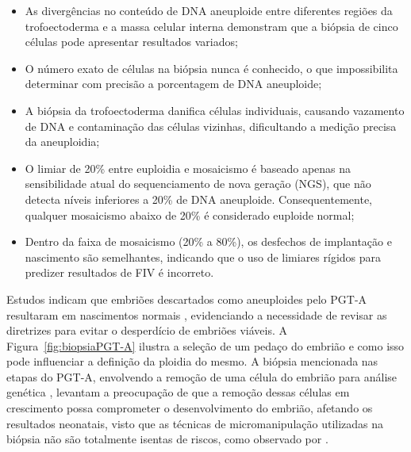 \begin{itemize}
    \item As divergências no conteúdo de DNA aneuploide entre diferentes regiões da trofoectoderma e a massa celular interna demonstram que a biópsia de cinco células pode apresentar resultados variados;
    \item O número exato de células na biópsia nunca é conhecido, o que impossibilita determinar com precisão a porcentagem de DNA aneuploide;
    \item A biópsia da trofoectoderma danifica células individuais, causando vazamento de DNA e contaminação das células vizinhas, dificultando a medição precisa da aneuploidia;
    \item O limiar de 20\% entre euploidia e mosaicismo é baseado apenas na sensibilidade atual do sequenciamento de nova geração (NGS), que não detecta níveis inferiores a 20\% de DNA aneuploide. Consequentemente, qualquer mosaicismo abaixo de 20\% é considerado euploide normal;
    \item Dentro da faixa de mosaicismo (20\% a 80\%), os desfechos de implantação e nascimento são semelhantes, indicando que o uso de limiares rígidos para predizer resultados de FIV é incorreto.
\end{itemize}

Estudos indicam que embriões descartados como aneuploides pelo PGT-A resultaram em nascimentos normais \cite{gleicher2021}, evidenciando a necessidade de revisar as diretrizes para evitar o desperdício de embriões viáveis. A Figura~\ref{fig:biopsiaPGT-A} ilustra a seleção de um pedaço do embrião e como isso pode influenciar a definição da ploidia do mesmo. A biópsia mencionada nas etapas do PGT-A, envolvendo a remoção de uma célula do embrião para análise genética , levantam a preocupação de que a remoção dessas células em crescimento possa comprometer o desenvolvimento do embrião, afetando os resultados neonatais, visto que as técnicas de micromanipulação utilizadas na biópsia não são totalmente isentas de riscos, como observado por .

